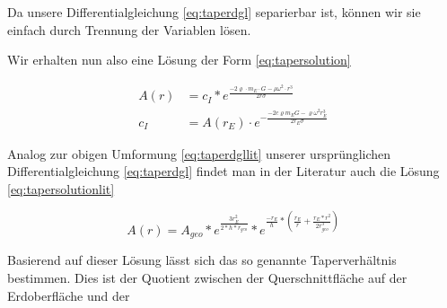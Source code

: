 \documentclass[a4paper, 10pt]{report}
\begin{document}
Da unsere Differentialgleichung \ref{eq:taperdgl} separierbar ist, können wir sie einfach durch Trennung der Variablen lösen.


Wir erhalten nun also eine Lösung der Form \ref{eq:tapersolution}

\begin{align}
A(r) &= c_I * e^{\frac{-2\varrho \cdot m_E \cdot G - \rho \omega^2 \cdot r^3}{2 r \sigma}}\label{eq:tapersolution}\\
c_I &= A(r_E) \cdot e^{-\frac{-2 c \varrho m_E G - \varrho \omega^2 r_E^3}{2 r_E \sigma}}
\end{align}

Analog zur obigen Umformung \ref{eq:taperdgllit} unserer ursprünglichen Differentialgleichung \ref{eq:taperdgl} findet man in der Literatur auch die Lösung \ref{eq:tapersolutionlit}

\begin{equation}
A(r)=A_{geo}*e^\frac{3r_E^2}{2*h*r_{geo}}*e^{\frac{-r_E}{h}*(\frac{r_E}{r}+\frac{r_E*r^2}{2r_{geo}^3})}
\label{eq:tapersolutionlit}
\end{equation}

Basierend auf dieser Lösung lässt sich das so genannte Taperverhältnis bestimmen. Dies ist der Quotient zwischen der Querschnittfläche auf der Erdoberfläche und der 
\end{document}
